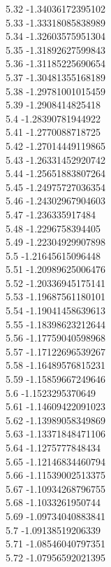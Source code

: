 {5.32	-1.34036172395102\\
5.33	-1.33318085838989\\
5.34	-1.32603575951304\\
5.35	-1.31892627599843\\
5.36	-1.31185225690654\\
5.37	-1.30481355168189\\
5.38	-1.29781001015459\\
5.39	-1.2908414825418\\
5.4	-1.28390781944922\\
5.41	-1.2770088718725\\
5.42	-1.27014449119865\\
5.43	-1.26331452920742\\
5.44	-1.25651883807264\\
5.45	-1.24975727036354\\
5.46	-1.24302967904603\\
5.47	-1.236335917484\\
5.48	-1.2296758394405\\
5.49	-1.22304929907898\\
5.5	-1.21645615096448\\
5.51	-1.20989625006476\\
5.52	-1.20336945175141\\
5.53	-1.19687561180101\\
5.54	-1.19041458639613\\
5.55	-1.18398623212644\\
5.56	-1.17759040598968\\
5.57	-1.17122696539267\\
5.58	-1.16489576815231\\
5.59	-1.15859667249646\\
5.6	-1.1523295370649\\
5.61	-1.14609422091023\\
5.62	-1.13989058349869\\
5.63	-1.13371848471106\\
5.64	-1.1275777848434\\
5.65	-1.12146834460794\\
5.66	-1.11539002513375\\
5.67	-1.10934268796755\\
5.68	-1.1033261950744\\
5.69	-1.09734040883841\\
5.7	-1.09138519206339\\
5.71	-1.08546040797351\\
5.72	-1.07956592021395\\
}
